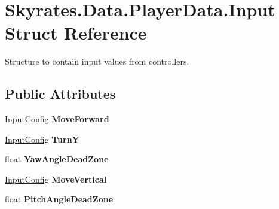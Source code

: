 \hypertarget{struct_skyrates_1_1_data_1_1_player_data_1_1_input}{\section{Skyrates.\-Data.\-Player\-Data.\-Input Struct Reference}
\label{struct_skyrates_1_1_data_1_1_player_data_1_1_input}
}


Structure to contain input values from controllers.  


\subsection*{Public Attributes}
\begin{DoxyCompactItemize}
\item 
\hypertarget{struct_skyrates_1_1_data_1_1_player_data_1_1_input_ab56219eda31d06a0606d9c76a83e37bc}{\hyperlink{class_skyrates_1_1_data_1_1_player_data_1_1_input_config}{Input\-Config} {\bfseries Move\-Forward}}\label{struct_skyrates_1_1_data_1_1_player_data_1_1_input_ab56219eda31d06a0606d9c76a83e37bc}

\item 
\hypertarget{struct_skyrates_1_1_data_1_1_player_data_1_1_input_a3a4b75f1db59c82f087853a416274b4e}{\hyperlink{class_skyrates_1_1_data_1_1_player_data_1_1_input_config}{Input\-Config} {\bfseries Turn\-Y}}\label{struct_skyrates_1_1_data_1_1_player_data_1_1_input_a3a4b75f1db59c82f087853a416274b4e}

\item 
\hypertarget{struct_skyrates_1_1_data_1_1_player_data_1_1_input_a4b9162afd95bd146b4394d3c128da45f}{float {\bfseries Yaw\-Angle\-Dead\-Zone}}\label{struct_skyrates_1_1_data_1_1_player_data_1_1_input_a4b9162afd95bd146b4394d3c128da45f}

\item 
\hypertarget{struct_skyrates_1_1_data_1_1_player_data_1_1_input_acf6b51aec5583119ae84a6977fe3e484}{\hyperlink{class_skyrates_1_1_data_1_1_player_data_1_1_input_config}{Input\-Config} {\bfseries Move\-Vertical}}\label{struct_skyrates_1_1_data_1_1_player_data_1_1_input_acf6b51aec5583119ae84a6977fe3e484}

\item 
\hypertarget{struct_skyrates_1_1_data_1_1_player_data_1_1_input_ad0c5566ec9e0cd745119e4858abf6398}{float {\bfseries Pitch\-Angle\-Dead\-Zone}}\label{struct_skyrates_1_1_data_1_1_player_data_1_1_input_ad0c5566ec9e0cd745119e4858abf6398}


\end{DoxyCompactItemize}
